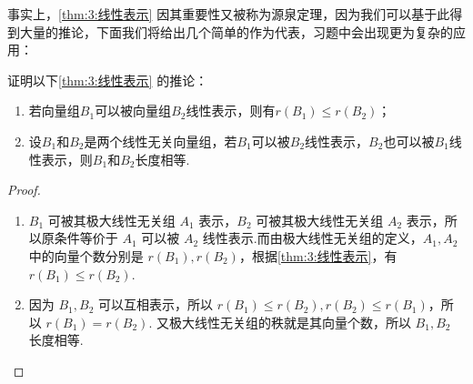 事实上，\autoref{thm:3:线性表示} 因其重要性又被称为源泉定理，因为我们可以基于此得到大量的推论，下面我们将给出几个简单的作为代表，习题中会出现更为复杂的应用：
\begin{example}\label{ex:3:线性表示推论}
    证明以下\autoref*{thm:3:线性表示} 的推论：
    \begin{enumerate}[label=(\arabic*)]
        \item 若向量组$B_1$可以被向量组$B_2$线性表示，则有$r(B_1)\leqslant r(B_2)$；

        \item \label{item:3:线性表示推论:2}
              设$B_1$和$B_2$是两个线性无关向量组，若$B_1$可以被$B_2$线性表示，$B_2$也可以被$B_1$线性表示，则$B_1$和$B_2$长度相等.
    \end{enumerate}
\end{example}

\begin{proof}
    \begin{enumerate}
        \item $B_1$ 可被其极大线性无关组 $A_1$ 表示，$B_2$ 可被其极大线性无关组 $A_2$ 表示，所以原条件等价于 $A_1$ 可以被 $A_2$ 线性表示.而由极大线性无关组的定义，$A_1, A_2$ 中的向量个数分别是 $r(B_1), r(B_2)$，根据\autoref{thm:3:线性表示}，有 $r(B_1)\leqslant r(B_2)$.

        \item 因为 $B_1, B_2$ 可以互相表示，所以 $r(B_1) \leqslant r(B_2),r(B_2) \leqslant r(B_1)$，所以 $r(B_1) = r(B_2)$. 又极大线性无关组的秩就是其向量个数，所以 $B_1, B_2$ 长度相等.
    \end{enumerate}
\end{proof}

